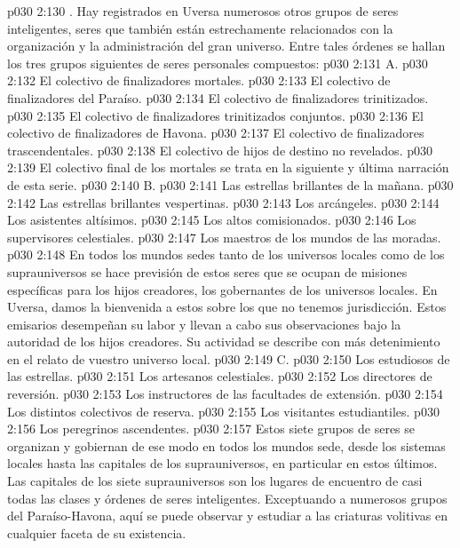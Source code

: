 \vs p030 2:130 \pc {}. Hay registrados en Uversa numerosos otros grupos de seres inteligentes, seres que también están estrechamente relacionados con la organización y la administración del gran universo. Entre tales órdenes se hallan los tres grupos siguientes de seres personales compuestos:
\vs p030 2:131 \pc A. 
\vs p030 2:132 El colectivo de finalizadores mortales.
\vs p030 2:133 El colectivo de finalizadores del Paraíso.
\vs p030 2:134 El colectivo de finalizadores trinitizados.
\vs p030 2:135 El colectivo de finalizadores trinitizados conjuntos.
\vs p030 2:136 El colectivo de finalizadores de Havona.
\vs p030 2:137 El colectivo de finalizadores trascendentales.
\vs p030 2:138 El colectivo de hijos de destino no revelados.
\vs p030 2:139 \pc El colectivo final de los mortales se trata en la siguiente y última narración de esta serie.
\vs p030 2:140 \pc B. 
\vs p030 2:141 Las estrellas brillantes de la mañana.
\vs p030 2:142 Las estrellas brillantes vespertinas.
\vs p030 2:143 Los arcángeles.
\vs p030 2:144 Los asistentes altísimos.
\vs p030 2:145 Los altos comisionados.
\vs p030 2:146 Los supervisores celestiales.
\vs p030 2:147 Los maestros de los mundos de las moradas.
\vs p030 2:148 \pc En todos los mundos sedes tanto de los universos locales como de los suprauniversos se hace previsión de estos seres que se ocupan de misiones específicas para los hijos creadores, los gobernantes de los universos locales. En Uversa, damos la bienvenida a estos  sobre los que no tenemos jurisdicción. Estos emisarios desempeñan su labor y llevan a cabo sus observaciones bajo la autoridad de los hijos creadores. Su actividad se describe con más detenimiento en el relato de vuestro universo local.
\vs p030 2:149 \pc C. 
\vs p030 2:150 Los estudiosos de las estrellas.
\vs p030 2:151 Los artesanos celestiales.
\vs p030 2:152 Los directores de reversión.
\vs p030 2:153 Los instructores de las facultades de extensión.
\vs p030 2:154 Los distintos colectivos de reserva.
\vs p030 2:155 Los visitantes estudiantiles.
\vs p030 2:156 Los peregrinos ascendentes.
\vs p030 2:157 \pc Estos siete grupos de seres se organizan y gobiernan de ese modo en todos los mundos sede, desde los sistemas locales hasta las capitales de los suprauniversos, en particular en estos últimos. Las capitales de los siete suprauniversos son los lugares de encuentro de casi todas las clases y órdenes de seres inteligentes. Exceptuando a numerosos grupos del Paraíso\hyp{}Havona, aquí se puede observar y estudiar a las criaturas volitivas en cualquier faceta de su existencia.

